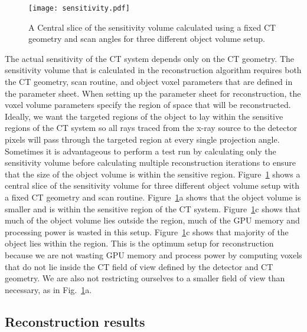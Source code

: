 \begin{figure}
\centering
\texttt{[image: sensitivity.pdf]}
\caption{A Central slice of the sensitivity volume calculated using a fixed CT geometry and scan angles for three different object volume setup.}
\label{fig:sensitivityslices}
\end{figure}

The actual sensitivity of the CT system depends only on the CT geometry.  The sensitivity volume that is calculated in the reconstruction algorithm requires both the CT geometry, scan routine, and object voxel parameters that are defined in the parameter sheet.  When setting up the parameter sheet for reconstruction, the voxel volume parameters specify the region of space that will be reconstructed.  Ideally, we want the targeted regions of the object to lay within the sensitive regions of the CT system so all rays traced from the x-ray source to the detector pixels will pass through the targeted region at every single projection angle.  Sometimes it is advantageous to perform a test run by calculating only the sensitivity volume before calculating multiple reconstruction iterations to ensure that the size of the object volume is within the sensitive region.  Figure~\ref{fig:sensitivityslices} shows a central slice of the sensitivity volume for three different object volume setup with a fixed CT geometry and scan routine.  Figure~\ref{fig:sensitivityslices}a shows that the object volume is smaller and is within the sensitive region of the CT system.  Figure~\ref{fig:sensitivityslices}c shows that much of the object volume lies outside the region, much of the GPU memory and processing power is wasted in this setup. Figure~\ref{fig:sensitivityslices}c shows that majority of the object lies within the region.  This is the optimum setup for reconstruction because we are not wasting GPU memory and process power by computing voxels that do not lie inside the CT field of view defined by the detector and CT geometry.  We are also not restricting ourselves to a smaller field of view than necessary, as in Fig.~\ref{fig:sensitivityslices}a.

\subsection{Reconstruction results}

